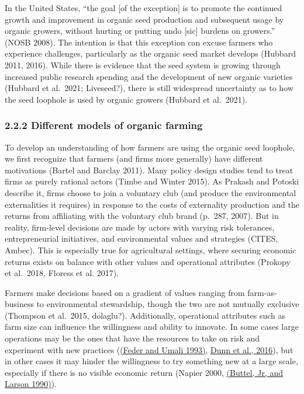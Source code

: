 \documentclass[twoside,12pt,final]{ucthesis-CA2012}
\begin{document}
\begin{ucmainmatter}
In the United States, ``the goal {[}of the exception{]} is to promote the
continued growth and improvement in organic seed production and
subsequent usage by organic growers, without hurting or putting undo
{[}sic{]} burdens on growers.'' (NOSB 2008). The intention is that this
exception can excuse farmers who experience challenges, particularly as
the organic seed market develops (Hubbard 2011, 2016). While there is
evidence that the seed system is growing through increased public
research spending and the development of new organic varieties (Hubbard
et al.~2021; Liveseed?), there is still widespread uncertainty as to how
the seed loophole is used by organic growers (Hubbard et al.~2021).

\hypertarget{different-models-of-organic-farming}{%
\subsubsection{2.2.2 Different models of organic farming}\label{different-models-of-organic-farming}}

To develop an understanding of how farmers are using the organic seed
loophole, we first recognize that farmers (and firms more generally)
have different motivations (Bartel and Barclay 2011). Many policy design
studies tend to treat firms as purely rational actors (Timbe and Winter
2015). As Prakash and Potoski describe it, \textquotesingle firms choose to join a
voluntary club (and produce the environmental externalities it requires)
in response to the costs of externality production and the returns from
affiliating with the voluntary club brand\textquotesingle{} (p.~287, 2007). But in
reality, firm-level decisions are made by actors with varying risk
tolerances, entrepreneurial initiatives, and environmental values and
strategies (CITES, Ambec). This is especially true for agricultural
settings, where securing economic returns exists on balance with other
values and operational attributes (Prokopy et al.~2018, Floress et al.
2017).

Farmers make decisions based on a gradient of values ranging from
\textquotesingle farm-as-business\textquotesingle{} to \textquotesingle environmental stewardship\textquotesingle, though the two
are not mutually exclusive (Thompson et al.~2015, dolaglu?).
Additionally, operational attributes such as farm size can influence the
willingness and ability to innovate. In some cases large operations may
be the ones that have the resources to take on risk and experiment with
new practices (\href{https://www.zotero.org/google-docs/?4hXARi}{(Feder and Umali
1993)}, \href{https://www.zotero.org/google-docs/?broken=rs6XVC}{Dunn et al.,
2016}), but in other
cases it may hinder the willingness to try something new at a large
scale, especially if there is no visible economic return (Napier 2000,
\href{https://www.zotero.org/google-docs/?FI07wa}{(Buttel, Jr, and Larson
1990)}).


\end{ucmainmatter}
\end{document}
